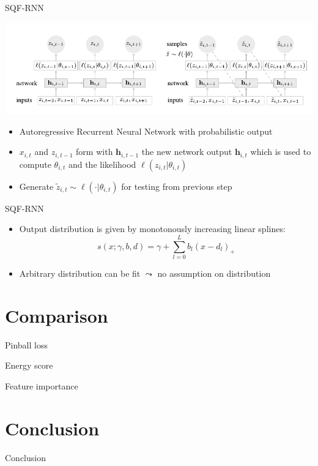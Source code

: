 \documentclass[10pt,aspectratio=169]{beamer}
\begin{document}
\begin{frame}{SQF-RNN}
    \begin{center}
        \includegraphics[width=\textwidth]{plots/deepar-rnn.pdf}
    \end{center}
    \begin{itemize}
        \item Autoregressive Recurrent Neural Network with probabilistic output
        \item \(x_{i, t}\) and \(z_{i, t-1}\) form with \(\boldsymbol{h}_{i,t-1}\) the new network output \(\boldsymbol{h}_{i,t}\)
        which is used to compute \(\theta_{i,t}\) and the likelihood \(\ell(z_{i,t} | \theta_{i,t})\)
        \item Generate \(\tilde{z}_{i, t} \sim \ell(\cdot | \theta_{i,t})\) for testing from previous step
    \end{itemize}
\end{frame}

\begin{frame}{SQF-RNN}
    \begin{itemize}
        \item Output distribution is given by monotonously increasing linear splines: 
        \[ s(x; \gamma, b, d) = \gamma + \sum_{l=0}^L b_l (x - d_l)_+ \]
        \item Arbitrary distribution can be fit \(\leadsto\) no assumption on distribution
    \end{itemize}
\end{frame}

\section{Comparison}

\begin{frame}{Pinball loss}
    
\end{frame}

\begin{frame}{Energy score}
    
\end{frame}

\begin{frame}{Feature importance}
    
\end{frame}

\section{Conclusion}

\begin{frame}{Conclusion}
    
\end{frame}
\end{document}
